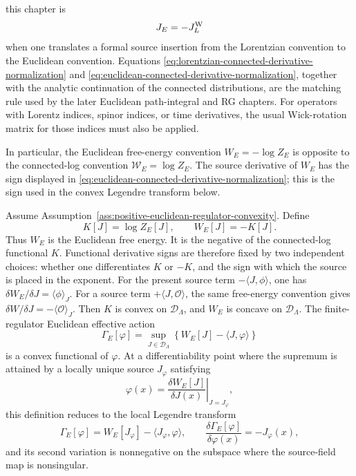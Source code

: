 \begin{definition}
this chapter is
\begin{equation}
  J_E=-J_L^{\rm W}
  \label{eq:lorentzian-euclidean-source-sign-map}
\end{equation}
when one translates a formal source insertion from the Lorentzian convention
to the Euclidean convention.  Equations
\eqref{eq:lorentzian-connected-derivative-normalization} and
\eqref{eq:euclidean-connected-derivative-normalization}, together with the
analytic continuation of the connected distributions, are the matching rule
used by the later Euclidean path-integral and RG chapters.  For operators with
Lorentz indices, spinor indices, or time derivatives, the usual Wick-rotation
matrix for those indices must also be applied.
\end{definition}

In particular, the Euclidean free-energy convention \(W_E=-\log Z_E\) is
opposite to the connected-log convention \(\mathcal W_E=\log Z_E\).  The source
derivative of \(W_E\) has the sign displayed in
\eqref{eq:euclidean-connected-derivative-normalization}; this is the sign used
in the convex Legendre transform below.

\begin{lemma}
\label{lem:volume-ii-euclidean-convexity-finite-regulator}
Assume Assumption~\ref{ass:positive-euclidean-regulator-convexity}.  Define
\[
  K[J]=\log Z_E[J],
  \qquad
  W_E[J]=-K[J].
\]
Thus \(W_E\) is the Euclidean free energy.  It is the negative of the
connected-log functional \(K\).  Functional derivative signs are therefore fixed
by two independent choices: whether one differentiates \(K\) or \(-K\), and the
sign with which the source is placed in the exponent.  For the present source
term \(-\langle J,\phi\rangle\), one has
\(\delta W_E/\delta J=\langle\phi\rangle_J\).  For a source term
\(+\langle J,\mathcal O\rangle\), the same free-energy convention gives
\(\delta W/\delta J=-\langle\mathcal O\rangle_J\).
Then \(K\) is convex on \(\mathcal D_\Lambda\), and \(W_E\) is concave on
\(\mathcal D_\Lambda\).  The finite-regulator Euclidean effective action
\[
  \Gamma_E[\varphi]
  =
  \sup_{J\in\mathcal D_\Lambda}
  \left\{
    W_E[J]-\langle J,\varphi\rangle
  \right\}
\]
is a convex functional of \(\varphi\).  At a differentiability point where the
supremum is attained by a locally unique source \(J_\varphi\) satisfying
\[
  \varphi(x)
  =
  \left.
  \frac{\delta W_E[J]}{\delta J(x)}
  \right|_{J=J_\varphi},
\]
this definition reduces to the local Legendre transform
\[
  \Gamma_E[\varphi]
  =
  W_E[J_\varphi]-\langle J_\varphi,\varphi\rangle,
  \qquad
  \frac{\delta\Gamma_E[\varphi]}{\delta\varphi(x)}
  =
  -J_\varphi(x),
\]
and its second variation is nonnegative on the subspace where the
source-field map is nonsingular.
\end{lemma}

